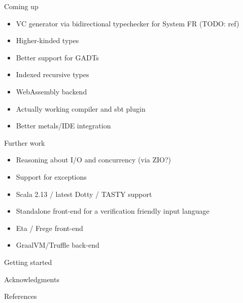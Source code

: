 \documentclass[
  ignorenonframetext,
]{beamer}
\newif\ifbibliography
\providecommand{\tightlist}{%
  \setlength{\itemsep}{0pt}\setlength{\parskip}{0pt}}
\begin{document}
\begin{frame}{Coming up}
\protect\hypertarget{coming-up}{}

\begin{itemize}
\tightlist
\item
  VC generator via bidirectional typechecker for System FR (TODO: ref)
\item
  Higher-kinded types
\item
  Better support for GADTs
\item
  Indexed recursive types
\item
  WebAssembly backend
\item
  Actually working compiler and sbt plugin
\item
  Better metals/IDE integration
\end{itemize}

\end{frame}

\begin{frame}{Further work}
\protect\hypertarget{further-work}{}

\begin{itemize}
\tightlist
\item
  Reasoning about I/O and concurrency (via ZIO?)
\item
  Support for exceptions
\item
  Scala 2.13 / latest Dotty / TASTY support
\item
  Standalone front-end for a verification friendly input language
\item
  Eta / Frege front-end
\item
  GraalVM/Truffle back-end
\end{itemize}

\end{frame}

\begin{frame}{Getting started}
\protect\hypertarget{getting-started}{}

\end{frame}

\begin{frame}{Acknowledgments}
\protect\hypertarget{acknowledgments}{}

\end{frame}

\begin{frame}[allowframebreaks]{References}
  \bibliographytrue
  \printbibliography[heading=none]
\end{frame}
\end{document}
